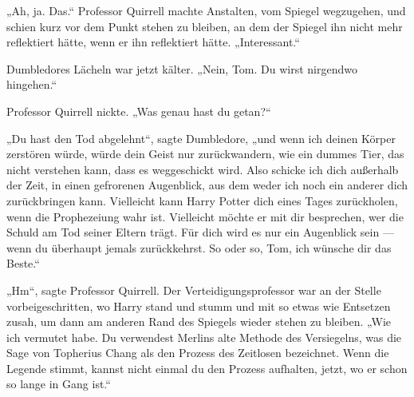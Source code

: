 „Ah, ja. Das.“
Professor Quirrell machte Anstalten, vom Spiegel wegzugehen, und schien kurz vor dem Punkt stehen zu bleiben, an dem der Spiegel ihn nicht mehr reflektiert hätte, wenn er ihn reflektiert hätte.
„Interessant.“

Dumbledores Lächeln war jetzt kälter.
„Nein, Tom. Du wirst nirgendwo hingehen.“

Professor Quirrell nickte.
„Was genau hast du getan?“

„Du hast den Tod abgelehnt“, sagte Dumbledore,
„und wenn ich deinen Körper zerstören würde, würde dein Geist nur zurückwandern, wie ein dummes Tier, das nicht verstehen kann, dass es weggeschickt wird. Also schicke ich dich außerhalb der Zeit, in einen gefrorenen Augenblick, aus dem weder ich noch ein anderer dich zurückbringen kann. Vielleicht kann Harry Potter dich eines Tages zurückholen, wenn die Prophezeiung wahr ist. Vielleicht möchte er mit dir besprechen, wer die Schuld am Tod seiner Eltern trägt. Für dich wird es nur ein Augenblick sein — wenn du überhaupt jemals zurückkehrst. So oder so, Tom, ich wünsche dir das Beste.“

„Hm“, sagte Professor Quirrell.
Der Verteidigungsprofessor war an der Stelle vorbeigeschritten, wo Harry stand und stumm und mit so etwas wie Entsetzen zusah, um dann am anderen Rand des Spiegels wieder stehen zu bleiben.
„Wie ich vermutet habe. Du verwendest Merlins alte Methode des Versiegelns, was die Sage von Topherius Chang als den Prozess des Zeitlosen bezeichnet. Wenn die Legende stimmt, kannst nicht einmal du den Prozess aufhalten, jetzt, wo er schon so lange in Gang ist.“

